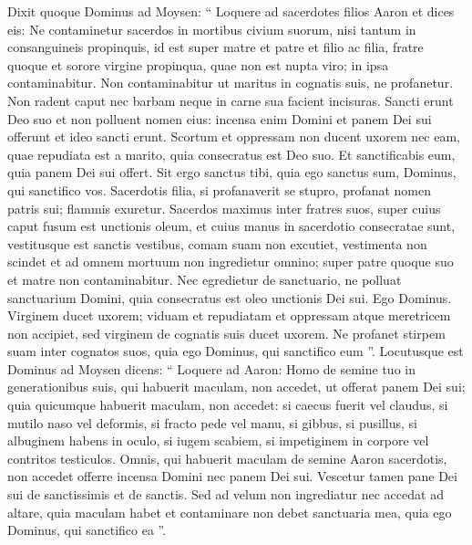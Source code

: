 \begin{biblechapter}
\begin{biblechapter}
\begin{biblechapter}
\begin{biblechapter}
\begin{biblechapter}
\begin{biblechapter}
\begin{biblechapter}
\begin{biblechapter}
\begin{biblechapter}
\begin{biblechapter}
\begin{biblechapter}
\begin{biblechapter}
\begin{biblechapter}
\begin{biblechapter}
\begin{biblechapter}
\begin{biblechapter}
\begin{biblechapter}
\begin{biblechapter}
\begin{biblechapter}
\begin{biblechapter}
\begin{biblechapter}
\verse Dixit quoque Dominus ad Moysen: “ Loquere ad sacerdotes filios Aaron et dices eis: Ne contaminetur sacerdos in mortibus civium suorum, 
\verse nisi tantum in consanguineis propinquis, id est super matre et patre et filio ac filia, fratre quoque 
\verse et sorore virgine propinqua, quae non est nupta viro; in ipsa contaminabitur. 
\verse Non contaminabitur ut maritus in cognatis suis, ne profanetur.
 \verse Non radent caput nec barbam neque in carne sua facient incisuras. 
\verse Sancti erunt Deo suo et non polluent nomen eius: incensa enim Domini et panem Dei sui offerunt et ideo sancti erunt.
 \verse Scortum et oppressam non ducent uxorem nec eam, quae repudiata est a marito, quia consecratus est Deo suo. 
\verse Et sanctificabis eum, quia panem Dei sui offert. Sit ergo sanctus tibi, quia ego sanctus sum, Dominus, qui sanctifico vos.
 \verse Sacerdotis filia, si profanaverit se stupro, profanat nomen patris sui; flammis exuretur.
 \verse Sacerdos maximus inter fratres suos, super cuius caput fusum est unctionis oleum, et cuius manus in sacerdotio consecratae sunt, vestitusque est sanctis vestibus, comam suam non excutiet, vestimenta non scindet 
\verse et ad omnem mortuum non ingredietur omnino; super patre quoque suo et matre non contaminabitur. 
\verse Nec egredietur de sanctuario, ne polluat sanctuarium Domini, quia consecratus est oleo unctionis Dei sui. Ego Dominus.
 \verse Virginem ducet uxorem; 
\verse viduam et repudiatam et oppressam atque meretricem non accipiet, sed virginem de cognatis suis ducet uxorem. 
\verse Ne profanet stirpem suam inter cognatos suos, quia ego Dominus, qui sanctifico eum ”.
 \verse Locutusque est Dominus ad Moysen dicens: 
\verse “ Loquere ad Aaron: Homo de semine tuo in generationibus suis, qui habuerit maculam, non accedet, ut offerat panem Dei sui; 
\verse quia quicumque habuerit maculam, non accedet: si caecus fuerit vel claudus, si mutilo naso vel deformis, 
\verse si fracto pede vel manu, 
 \verse si gibbus, si pusillus, si albuginem habens in oculo, si iugem scabiem, si impetiginem in corpore vel contritos testiculos. 
\verse Omnis, qui habuerit maculam de semine Aaron sacerdotis, non accedet offerre incensa Domini nec panem Dei sui.
 \verse Vescetur tamen pane Dei sui de sanctissimis et de sanctis. 
\verse Sed ad velum non ingrediatur nec accedat ad altare, quia maculam habet et contaminare non debet sanctuaria mea, quia ego Dominus, qui sanctifico ea ”.

\end{biblechapter}
\end{biblechapter}
\end{biblechapter}
\end{biblechapter}
\end{biblechapter}
\end{biblechapter}
\end{biblechapter}
\end{biblechapter}
\end{biblechapter}
\end{biblechapter}
\end{biblechapter}
\end{biblechapter}
\end{biblechapter}
\end{biblechapter}
\end{biblechapter}
\end{biblechapter}
\end{biblechapter}
\end{biblechapter}
\end{biblechapter}
\end{biblechapter}
\end{biblechapter}
